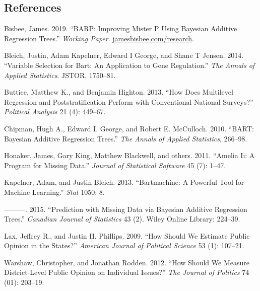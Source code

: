 \documentclass[]{article}
\begin{document}
\subsection*{References}\label{references}

\hypertarget{refs}{}
\hypertarget{ref-bisbee2019barp}{}
Bisbee, James. 2019. ``BARP: Improving Mister P Using Bayesian Additive
Regression Trees.'' \emph{Working Paper}.
\url{jamesbisbee.com/research}.

\hypertarget{ref-bleich2014variable}{}
Bleich, Justin, Adam Kapelner, Edward I George, and Shane T Jensen.
2014. ``Variable Selection for Bart: An Application to Gene
Regulation.'' \emph{The Annals of Applied Statistics}. JSTOR, 1750--81.

\hypertarget{ref-buttice_how_2013}{}
Buttice, Matthew K., and Benjamin Highton. 2013. ``How Does Multilevel
Regression and Poststratification Perform with Conventional National
Surveys?'' \emph{Political Analysis} 21 (4): 449--67.

\hypertarget{ref-chipman_bart:_2010}{}
Chipman, Hugh A., Edward I. George, and Robert E. McCulloch. 2010.
``BART: Bayesian Additive Regression Trees.'' \emph{The Annals of
Applied Statistics}, 266--98.

\hypertarget{ref-honaker2011amelia}{}
Honaker, James, Gary King, Matthew Blackwell, and others. 2011. ``Amelia
Ii: A Program for Missing Data.'' \emph{Journal of Statistical Software}
45 (7): 1--47.

\hypertarget{ref-kapelner2013bartmachine}{}
Kapelner, Adam, and Justin Bleich. 2013. ``Bartmachine: A Powerful Tool
for Machine Learning.'' \emph{Stat} 1050: 8.

\hypertarget{ref-kapelner2015prediction}{}
---------. 2015. ``Prediction with Missing Data via Bayesian Additive
Regression Trees.'' \emph{Canadian Journal of Statistics} 43 (2). Wiley
Online Library: 224--39.

\hypertarget{ref-lax_how_2009}{}
Lax, Jeffrey R., and Justin H. Phillips. 2009. ``How Should We Estimate
Public Opinion in the States?'' \emph{American Journal of Political
Science} 53 (1): 107--21.

\hypertarget{ref-warshaw_how_2012}{}
Warshaw, Christopher, and Jonathan Rodden. 2012. ``How Should We Measure
District-Level Public Opinion on Individual Issues?'' \emph{The Journal
of Politics} 74 (01): 203--19.
\end{document}
